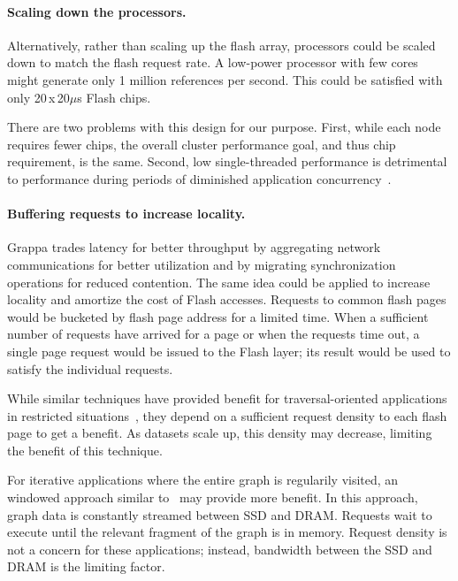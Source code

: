\paragraph{Scaling down the processors.}
Alternatively, rather than scaling up the flash array, processors
could be scaled down to match the flash request rate. A low-power
processor with few cores might generate only 1 million references per
second. This could be satisfied with only 20\,x\,20$\mu$s Flash chips.

There are two problems with this design for our purpose. First, while each node
requires fewer chips, the overall cluster performance goal, and thus
chip requirement, is the same. Second, low single-threaded performance is detrimental to performance during periods of diminished application concurrency~\cite{feo:xmt}.

\paragraph{Buffering requests to increase locality.}
Grappa trades latency for better throughput by aggregating network
communications for better utilization and by migrating synchronization
operations for reduced contention. The same idea could be applied to
increase locality and amortize the cost of Flash accesses. Requests
to common flash pages would be bucketed by flash page address for a
limited time. When a sufficient number of requests have arrived for a page
or when the requests time out, a single page request would be issued to the Flash
layer; its result would be used to satisfy the individual requests.

While similar techniques have provided benefit for traversal-oriented applications in
restricted situations~\cite{magt:2010}, they depend on a sufficient request
density to each flash page to get a benefit. As datasets scale up, this
density may decrease, limiting the benefit of this technique.

For iterative applications where the entire graph is regularily
visited, an windowed approach similar to~\cite{graphchi:osdi12} may
provide more benefit. In this approach, graph data is constantly
streamed between SSD and DRAM. Requests wait to execute until the
relevant fragment of the graph is in memory. Request density is not a
concern for these applications; instead, bandwidth between the SSD and
DRAM is the limiting factor.


